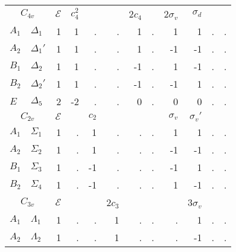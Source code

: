 \documentclass[twocolumn,showpacs,preprintnumbers,superscriptaddress,prb,floatfix,aps,10pt]{revtex4-1}
\newcommand*{\id}{\mathcal{E}}
\begin{document}
\begin{table}
\begin{ruledtabular}
\begin{tabular*}{10cm}{llrrrrrrrrrr}
\multicolumn{2}{c}{$C_{4v}$}      &$\id$& $c_4^2$&        &        & 2$c_4$ &      & 2$\sigma_v$ &  $\sigma_d$ &             &             \\ 
$A_1$           & $\Delta_{1}  $  &  1  &     1  &     .  &     .  &     1  &   .  &          1  &          1  &          .  &          .  \\         %
$A_2$           & $\Delta_{1}' $  &  1  &     1  &     .  &     .  &     1  &   .  &         -1  &         -1  &          .  &          .  \\         %
$B_1$           & $\Delta_{2}  $  &  1  &     1  &     .  &     .  &    -1  &   .  &          1  &         -1  &          .  &          .  \\         %
$B_2$           & $\Delta_{2}' $  &  1  &     1  &     .  &     .  &    -1  &   .  &         -1  &          1  &          .  &          .  \\         %
$E$             & $\Delta_{5}  $  &  2  &    -2  &     .  &     .  &     0  &   .  &          0  &          0  &          .  &          .  \\ \hline  %
\multicolumn{2}{c}{$C_{2v}$}      &$\id$&        &  $c_2$ &        &        &      &  $\sigma_v$ & $\sigma_v'$ &             &             \\
$A_{1}$         & $\Sigma_{1}  $  &  1  &     .  &     1  &     .  &     .  &   .  &          1  &          1  &          .  &          .  \\
$A_{2}$         & $\Sigma_{2}  $  &  1  &     .  &     1  &     .  &     .  &   .  &         -1  &         -1  &          .  &          .  \\
$B_{1}$         & $\Sigma_{3}  $  &  1  &     .  &    -1  &     .  &     .  &   .  &         -1  &          1  &          .  &          .  \\
$B_{2}$         & $\Sigma_{4}  $  &  1  &     .  &    -1  &     .  &     .  &   .  &          1  &         -1  &          .  &          .  \\ \hline
\multicolumn{2}{c}{$C_{3v}$}      &$\id$&        &        & 2$c_3$ &        &      &             & 3$\sigma_v$ &             &             \\
$A_{1}$         & $\Lambda_{1} $  &  1  &     .  &     .  &     1  &     .  &   .  &          .  &          1  &          .  &          .  \\
$A_{2}$         & $\Lambda_{2} $  &  1  &     .  &     .  &     1  &     .  &   .  &          .  &         -1  &          .  &          .  \\

\end{tabular*}
\end{ruledtabular}
\end{table}
\end{document}
